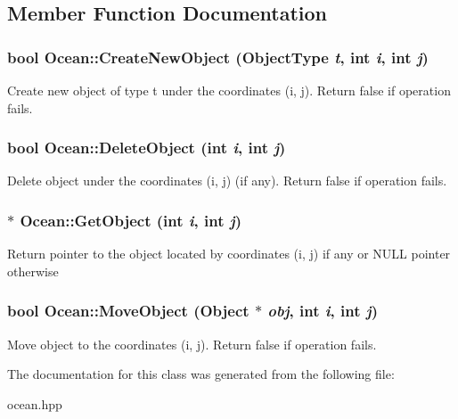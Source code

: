 \subsection{Member Function Documentation}
\hypertarget{classOcean_a66c18f1745faa96683ba9d42bcdec9bb}{
\subsubsection[{CreateNewObject}]{\setlength{\rightskip}{0pt plus 5cm}bool Ocean::CreateNewObject (ObjectType {\em t}, \/  int {\em i}, \/  int {\em j})}}
\label{classOcean_a66c18f1745faa96683ba9d42bcdec9bb}
Create new object of type t under the coordinates (i, j). Return false if operation fails. \hypertarget{classOcean_a15165a09cbd8a6075d622902f562bc15}{
\subsubsection[{DeleteObject}]{\setlength{\rightskip}{0pt plus 5cm}bool Ocean::DeleteObject (int {\em i}, \/  int {\em j})}}
\label{classOcean_a15165a09cbd8a6075d622902f562bc15}
Delete object under the coordinates (i, j) (if any). Return false if operation fails. \hypertarget{classOcean_abe1c2639f431f057509ba765682fb8cc}{
\subsubsection[{GetObject}]{$\ast$ Ocean::GetObject (int {\em i}, \/  int {\em j})}}
\label{classOcean_abe1c2639f431f057509ba765682fb8cc}
Return pointer to the object located by coordinates (i, j) if any or NULL pointer otherwise \hypertarget{classOcean_a7b9cb70ece3c3275003ea49bdba2c2e2}{
\subsubsection[{MoveObject}]{\setlength{\rightskip}{0pt plus 5cm}bool Ocean::MoveObject ({\bf Object} $\ast$ {\em obj}, \/  int {\em i}, \/  int {\em j})}}
\label{classOcean_a7b9cb70ece3c3275003ea49bdba2c2e2}
Move object to the coordinates (i, j). Return false if operation fails. 

The documentation for this class was generated from the following file:\begin{DoxyCompactItemize}
\item 
ocean.hpp\end{DoxyCompactItemize}
